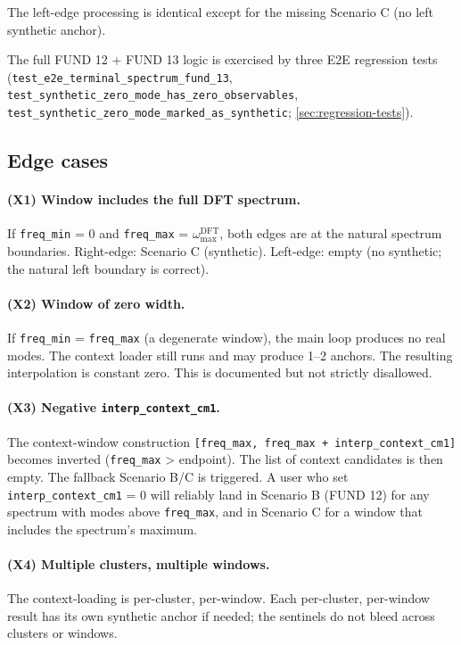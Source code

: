 \documentclass[10pt,a4paper,twoside]{article}
\newcommand{\cfgkey}[1]{\texttt{#1}}
\begin{document}
The left-edge processing is identical except for the missing
Scenario C (no left synthetic anchor).

The full FUND 12 + FUND 13 logic is exercised by three E2E
regression tests
(\texttt{test\_e2e\_terminal\_spectrum\_fund\_13},
\texttt{test\_synthetic\_zero\_mode\_has\_zero\_observables},
\texttt{test\_synthetic\_zero\_mode\_marked\_as\_synthetic};
\cref{sec:regression-tests}).

\subsection{Edge cases}

\paragraph{(X1) Window includes the full DFT spectrum.}
If \cfgkey{freq\_min} = 0 and \cfgkey{freq\_max} = $\omega_\text{max}^\text{DFT}$,
both edges are at the natural spectrum boundaries. Right-edge:
Scenario C (synthetic). Left-edge: empty (no synthetic; the
natural left boundary is correct).

\paragraph{(X2) Window of zero width.}
If \cfgkey{freq\_min} = \cfgkey{freq\_max} (a degenerate window),
the main loop produces no real modes. The context loader still
runs and may produce 1--2 anchors. The resulting interpolation is
constant zero. This is documented but not strictly disallowed.

\paragraph{(X3) Negative \cfgkey{interp\_context\_cm1}.}
The context-window construction
\texttt{[freq\_max, freq\_max + interp\_context\_cm1]} becomes
inverted (\texttt{freq\_max} > endpoint). The list of context
candidates is then empty. The fallback Scenario B/C is triggered.
A user who set \cfgkey{interp\_context\_cm1} = 0 will reliably
land in Scenario B (FUND 12) for any spectrum with modes above
\cfgkey{freq\_max}, and in Scenario C for a window that includes
the spectrum's maximum.

\paragraph{(X4) Multiple clusters, multiple windows.}
The context-loading is per-cluster, per-window. Each per-cluster,
per-window result has its own synthetic anchor if needed; the
sentinels do not bleed across clusters or windows.
\end{document}
